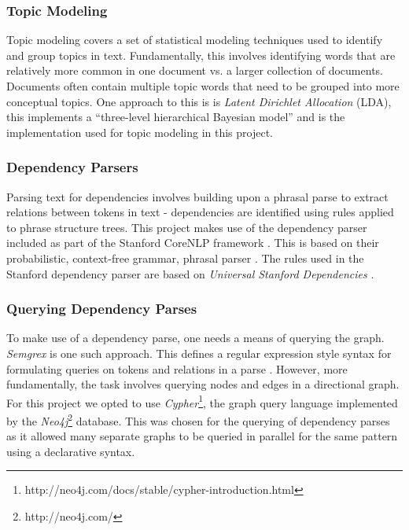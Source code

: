       \tocless\subsubsection{Topic Modeling}

        Topic modeling covers a set of statistical modeling techniques used to identify and group topics in text. Fundamentally, this involves identifying words that are relatively more common in one document vs. a larger collection of documents. Documents often contain multiple topic words that need to be grouped into more conceptual topics. One approach to this is is \textit{Latent Dirichlet Allocation} (LDA), this implements a ``three-level hierarchical Bayesian model'' \cite{blei2003latent} and is the implementation used for topic modeling in this project.

      \tocless\subsubsection{Dependency Parsers}

        Parsing text for dependencies involves building upon a phrasal parse to extract relations between tokens in text - dependencies are identified using rules applied to phrase structure trees. This project makes use of the dependency parser included as part of the Stanford CoreNLP framework \cite{de2006generating}. This is based on their probabilistic, context-free grammar, phrasal parser \cite{klein2003accurate}. The rules used in the Stanford dependency parser are based on \textit{Universal Stanford Dependencies} \cite{de2014universal}.

      \tocless\subsubsection{Querying Dependency Parses}

        To make use of a dependency parse, one needs a means of querying the graph. \textit{Semgrex} is one such approach. This defines a regular expression style syntax for formulating queries on tokens and relations in a parse \cite{Chambers2007}. However, more fundamentally, the task involves querying nodes and edges in a directional graph. For this project we opted to use \textit{Cypher}\footnote{http://neo4j.com/docs/stable/cypher-introduction.html}, the graph query language implemented by the \textit{Neo4j}\footnote{http://neo4j.com/} database. This was chosen for the querying of dependency parses as it allowed many separate graphs to be queried in parallel for the same pattern using a declarative syntax.

